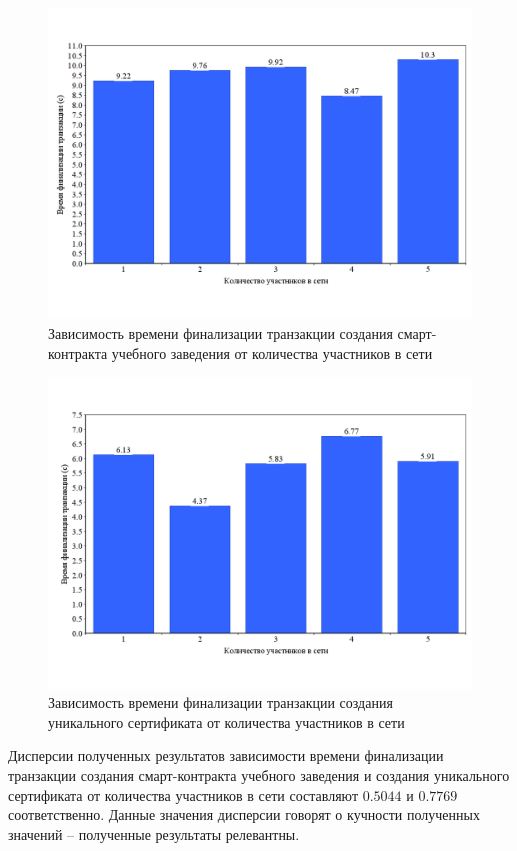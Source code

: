 \begin{figure}[!htb]
	\centering
	\includegraphics[width=\textwidth - 40pt]{img/t_org.png}
	\caption{Зависимость времени финализации транзакции создания смарт-контракта учебного заведения от количества участников в сети}
	\label{fig:a13}
\end{figure}


\begin{figure}[!htb]
	\centering
	\includegraphics[width=\textwidth - 40pt]{img/t_token.png}
	\caption{Зависимость времени финализации транзакции создания уникального сертификата от количества участников в сети}
	\label{fig:a14}
\end{figure}

Дисперсии полученных результатов зависимости времени финализации транзакции создания смарт-контракта учебного заведения и создания уникального сертификата от количества участников в сети составляют $0.5044$ и $0.7769$ соответственно. Данные значения дисперсии говорят о кучности полученных значений -- полученные результаты релевантны.

